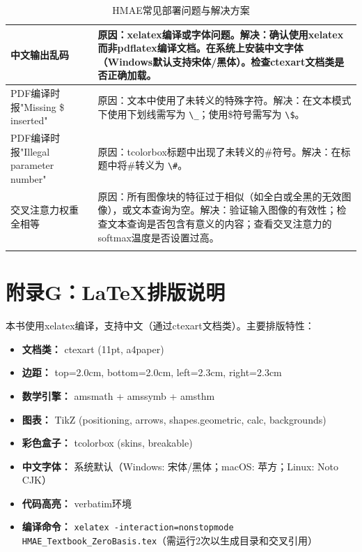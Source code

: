 \documentclass[11pt,a4paper]{ctexart}
\begin{document}
\begin{longtable}{p{4cm}p{10cm}}
中文输出乱码 & 原因：xelatex编译或字体问题。解决：确认使用xelatex而非pdflatex编译文档。在系统上安装中文字体（Windows默认支持宋体/黑体）。检查ctexart文档类是否正确加载。\\
\midrule

PDF编译时报"Missing \$ inserted" & 原因：文本中使用了未转义的特殊字符。解决：在文本模式下使用下划线需写为 \texttt{\textbackslash\_}；使用\$符号需写为 \texttt{\textbackslash\$}。\\
\midrule

PDF编译时报"Illegal parameter number" & 原因：tcolorbox标题中出现了未转义的\#符号。解决：在标题中将\#转义为 \texttt{\textbackslash\#}。\\
\midrule

交叉注意力权重全相等 & 原因：所有图像块的特征过于相似（如全白或全黑的无效图像），或文本查询为空。解决：验证输入图像的有效性；检查文本查询是否包含有意义的内容；查看交叉注意力的softmax温度是否设置过高。\\
\midrule

\caption{HMAE常见部署问题与解决方案}
\end{longtable}
\normalsize



\section*{附录G：LaTeX排版说明}

本书使用xelatex编译，支持中文（通过ctexart文档类）。主要排版特性：

\begin{itemize}[nosep]
\item \textbf{文档类：} ctexart (11pt, a4paper)
\item \textbf{边距：} top=2.0cm, bottom=2.0cm, left=2.3cm, right=2.3cm
\item \textbf{数学引擎：} amsmath + amssymb + amsthm
\item \textbf{图表：} TikZ (positioning, arrows, shapes.geometric, calc, backgrounds)
\item \textbf{彩色盒子：} tcolorbox (skins, breakable)
\item \textbf{中文字体：} 系统默认（Windows: 宋体/黑体；macOS: 苹方；Linux: Noto CJK）
\item \textbf{代码高亮：} verbatim环境
\item \textbf{编译命令：} \texttt{xelatex -interaction=nonstopmode HMAE\_Textbook\_ZeroBasis.tex}（需运行2次以生成目录和交叉引用）
\end{itemize}
\end{document}
